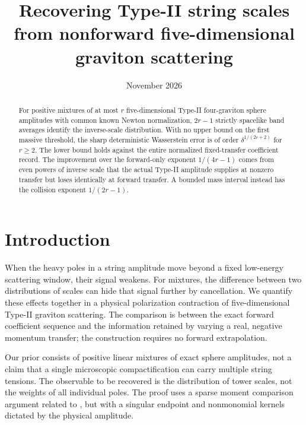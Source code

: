 \documentclass[11pt]{article}
\title{Recovering Type-II string scales from nonforward five-dimensional graviton scattering}
\author{}
\date{November 2026}
\begin{document}
\maketitle
\begin{abstract}
For positive mixtures of at most \(r\) five-dimensional Type-II four-graviton sphere amplitudes with common known Newton normalization, \(2r-1\) strictly spacelike band averages identify the inverse-scale distribution. With no upper bound on the first massive threshold, the sharp deterministic Wasserstein error is of order \(\delta^{1/(2r+2)}\) for \(r\ge2\). The lower bound holds against the entire normalized fixed-transfer coefficient record. The improvement over the forward-only exponent \(1/(4r-1)\) comes from even powers of inverse scale that the actual Type-II amplitude supplies at nonzero transfer but loses identically at forward transfer. A bounded mass interval instead has the collision exponent \(1/(2r-1)\).
\end{abstract}

\section{Introduction}
When the heavy poles in a string amplitude move beyond a fixed low-energy scattering window, their signal weakens. For mixtures, the difference between two distributions of scales can hide that signal further by cancellation. We quantify these effects together in a physical polarization contraction of five-dimensional Type-II graviton scattering. The comparison is between the exact forward coefficient sequence and the information retained by varying a real, negative momentum transfer; the construction requires no forward extrapolation.

Our prior consists of positive linear mixtures of exact sphere amplitudes, not a claim that a single microscopic compactification can carry multiple string tensions. The observable to be recovered is the distribution of tower scales, not the weights of all individual poles. The proof uses a sparse moment comparison argument related to \cite{WuYang}, but with a singular endpoint and nonmonomial kernels dictated by the physical amplitude.
\end{document}
